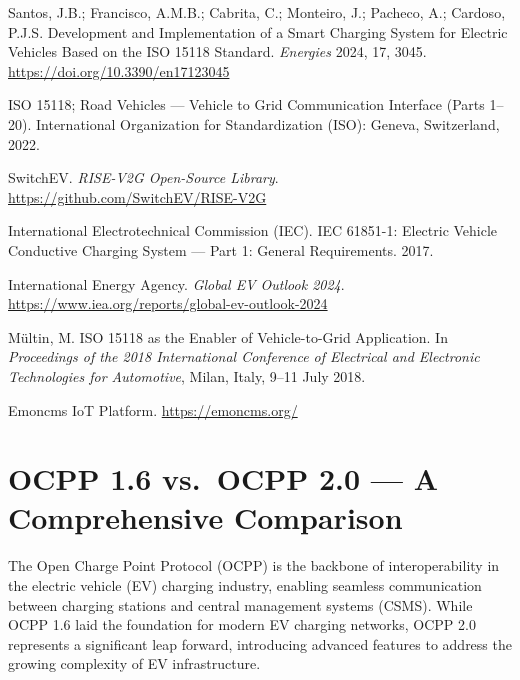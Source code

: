 \documentclass[12pt,a4paper]{report}
\begin{document}
\begin{enumerate}[label={[\arabic*]}]
  \item Santos, J.B.; Francisco, A.M.B.; Cabrita, C.; Monteiro, J.; Pacheco, A.; Cardoso, P.J.S.
        Development and Implementation of a Smart Charging System for Electric Vehicles Based on
        the ISO 15118 Standard. \textit{Energies} 2024, 17, 3045.
        \url{https://doi.org/10.3390/en17123045}

  \item ISO 15118; Road Vehicles --- Vehicle to Grid Communication Interface (Parts 1--20).
        International Organization for Standardization (ISO): Geneva, Switzerland, 2022.

  \item SwitchEV. \textit{RISE-V2G Open-Source Library}.
        \url{https://github.com/SwitchEV/RISE-V2G}

  \item International Electrotechnical Commission (IEC). IEC 61851-1: Electric Vehicle
        Conductive Charging System --- Part 1: General Requirements. 2017.

  \item International Energy Agency. \textit{Global EV Outlook 2024}.
        \url{https://www.iea.org/reports/global-ev-outlook-2024}

  \item Mültin, M. ISO 15118 as the Enabler of Vehicle-to-Grid Application. In
        \textit{Proceedings of the 2018 International Conference of Electrical and Electronic
        Technologies for Automotive}, Milan, Italy, 9--11 July 2018.

  \item Emoncms IoT Platform. \url{https://emoncms.org/}
\end{enumerate}

\chapter{OCPP 1.6 vs.\ OCPP 2.0 --- A Comprehensive Comparison}

The Open Charge Point Protocol (OCPP) is the backbone of interoperability in the electric
vehicle (EV) charging industry, enabling seamless communication between charging stations and
central management systems (CSMS). While OCPP 1.6 laid the foundation for modern EV charging
networks, OCPP 2.0 represents a significant leap forward, introducing advanced features to
address the growing complexity of EV infrastructure.
\end{document}
